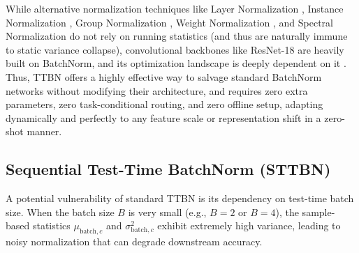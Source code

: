 \documentclass{article}
\theoremstyle{plain}
\theoremstyle{definition}
\theoremstyle{remark}
\begin{document}
While alternative normalization techniques like Layer Normalization \cite{ba2016layer}, Instance Normalization \cite{ulyanov2016instance}, Group Normalization \cite{wu2018group}, Weight Normalization \cite{salimans2016weight}, and Spectral Normalization \cite{miyato2018spectral} do not rely on running statistics (and thus are naturally immune to static variance collapse), convolutional backbones like ResNet-18 are heavily built on BatchNorm, and its optimization landscape is deeply dependent on it \cite{santurkar2018how}. Thus, TTBN offers a highly effective way to salvage standard BatchNorm networks without modifying their architecture, and requires zero extra parameters, zero task-conditional routing, and zero offline setup, adapting dynamically and perfectly to any feature scale or representation shift in a zero-shot manner.

\subsection{Sequential Test-Time BatchNorm (STTBN)}
\label{sec:sttbn}

A potential vulnerability of standard TTBN is its dependency on test-time batch size. When the batch size $B$ is very small (e.g., $B = 2$ or $B = 4$), the sample-based statistics $\mu_{\text{batch}, c}$ and $\sigma^2_{\text{batch}, c}$ exhibit extremely high variance, leading to noisy normalization that can degrade downstream accuracy. 
\end{document}
